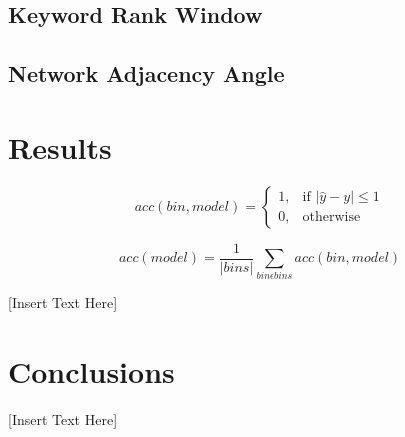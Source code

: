 \documentclass[11pt]{article}
\begin{document}
\subsection{Keyword Rank Window}
\label{sect:keyword}


\subsection{Network Adjacency Angle}
\label{sect:angle}

\section{Results}
\label{results}


\begin{equation}
acc(bin, model) = 
\begin{cases} 
1, & \text{if } |\hat{y}-y| \leq 1 \\
0, & \text{otherwise}
\end{cases}
\end{equation}

\begin{equation}
acc(model) = \frac{1}{|bins|} \sum_{bin  \epsilon  bins} acc(bin, model)
\end{equation}


[Insert Text Here]

\section{Conclusions}
\label{conclusions}

[Insert Text Here]


%
%
\end{document}
